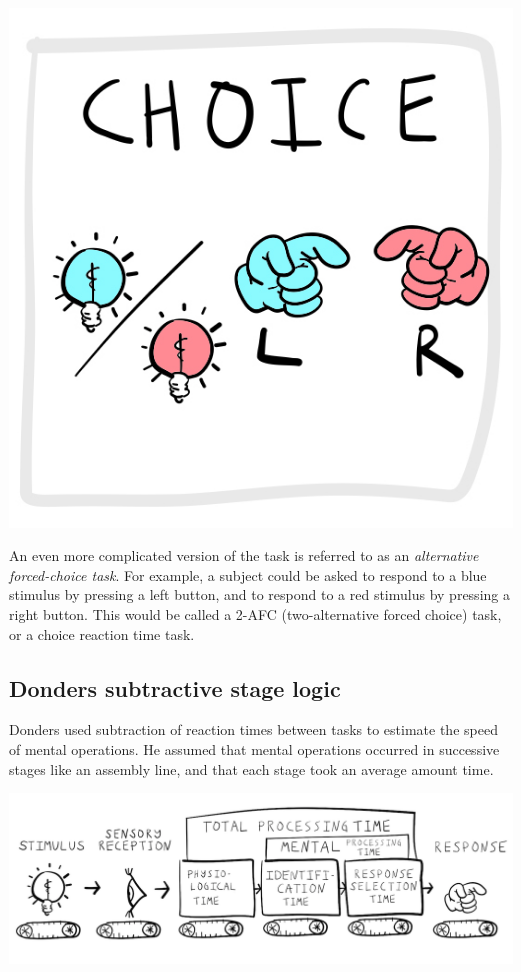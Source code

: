 \documentclass[
  oneside,
  12pt]{crumpbook}
\newenvironment{floatright25}{%
  \wrapfigure{R}{.25\textwidth}%
  }{%
  \endwrapfigure}
\begin{document}
\begin{floatright25}
\includegraphics[width=1\linewidth]{imgs/Donders_Choice}

\end{floatright25}

An even more complicated version of the task is referred to as an \emph{alternative forced-choice task}. For example, a subject could be asked to respond to a blue stimulus by pressing a left button, and to respond to a red stimulus by pressing a right button. This would be called a 2-AFC (two-alternative forced choice) task, or a choice reaction time task.

\hypertarget{donders-subtractive-stage-logic}{%
\subsection{Donders subtractive stage logic}\label{donders-subtractive-stage-logic}}

Donders used subtraction of reaction times between tasks to estimate the speed of mental operations. He assumed that mental operations occurred in successive stages like an assembly line, and that each stage took an average amount time.

\begin{center}\includegraphics[width=1\linewidth]{imgs/Donders_Assembly} \end{center}
\end{document}
